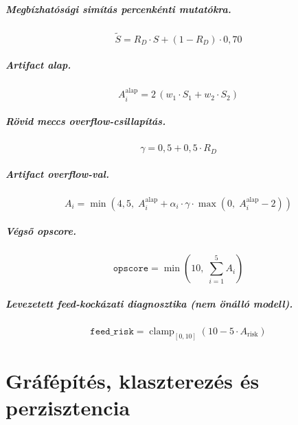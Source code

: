﻿\documentclass[a4paper,12pt]{report}
\begin{document}
\paragraph{Megbízhatósági simítás percenkénti mutatókra.}
\begin{equation}
\tilde{S} = R_D \cdot S + (1 - R_D) \cdot 0{,}70
\end{equation}

\paragraph{Artifact alap.}
\begin{equation}
A_i^{\text{alap}} = 2\,(w_1 \cdot S_1 + w_2 \cdot S_2)
\end{equation}

\paragraph{Rövid meccs overflow-csillapítás.}
\begin{equation}
\gamma = 0{,}5 + 0{,}5 \cdot R_D
\end{equation}

\paragraph{Artifact overflow-val.}
\begin{equation}
A_i = \min\!\left(4{,}5,\; A_i^{\text{alap}} + \alpha_i \cdot \gamma \cdot \max\!\left(0,\; A_i^{\text{alap}} - 2\right)\right)
\end{equation}

\paragraph{Végső opscore.}
\begin{equation}
\texttt{opscore} = \min\!\left(10,\; \sum_{i=1}^{5} A_i\right)
\end{equation}

\paragraph{Levezetett feed-kockázati diagnosztika (nem önálló modell).}
\begin{equation}
\texttt{feed\_risk} = \operatorname{clamp}_{[0,10]}\!\left(10 - 5 \cdot A_{\text{risk}}\right)
\end{equation}

\chapter{Gráfépítés, klaszterezés és perzisztencia}
\end{document}
